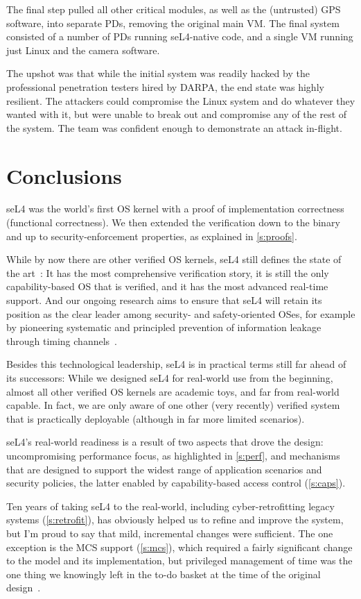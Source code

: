 \documentclass[english,a4paper,12pt]{report}
\newcommand{\Sect}[1]{\section{#1}}
\newcommand{\Sect}[1]{\chapter{#1}}
\begin{document}
  The final step pulled all other critical modules, as well as the
  (untrusted) GPS software, into separate PDs, removing
  the original main VM. The final system consisted of a number of
  PDs running seL4-native code, and a single VM running
  just Linux and the camera software.

  The upshot was that while the initial system was readily hacked by
  the professional penetration testers hired by DARPA, the end state was highly
  resilient. The attackers could compromise the Linux system and do
  whatever they wanted with it, but were unable to break out and
  compromise any of the rest of the system. The team was confident
  enough to demonstrate an attack in-flight.

  \Sect{\label{s:concl}Conclusions}

  seL4 was the world's first OS kernel with a proof of implementation
  correctness (functional correctness). We then extended the
  verification down to the
  binary and up to security-enforcement properties, as explained in
  \autoref{s:proofs}.

  While by now there are other verified OS kernels, seL4 still defines
  the state of the art~\citep{Heiser:10y-blog}: It has the most
  comprehensive verification story, it is still the only
  capability-based OS that is verified, and it has the most advanced
  real-time support. And our ongoing research aims to ensure that
  seL4 will retain its position as the clear leader among security-
  and safety-oriented OSes, for example by pioneering systematic and
  principled prevention of information leakage through timing
  channels~\citep{Ge_YCH_19}.

  Besides this technological leadership, seL4 is in practical terms
  still far ahead of its successors: While we designed seL4 for
  real-world use from the beginning, almost all other verified OS
  kernels are academic toys, and far from real-world capable. In fact, we
  are only aware of one other (very recently) verified system that is
  practically deployable (although in far more limited scenarios).

  seL4's real-world readiness is a result of two aspects that drove
  the design: uncompromising performance focus, as highlighted in
  \autoref{s:perf}, and mechanisms that are designed to support the
  widest range of application scenarios and security policies, the
  latter enabled by capability-based access control
  (\autoref{s:caps}).

  Ten years of taking seL4 to the real-world, including
  cyber-retrofitting legacy systems (\autoref{s:retrofit}), has obviously
  helped us to refine and improve the system, but I'm proud to say that
  mild, incremental changes were sufficient. The one exception is the
  MCS support (\autoref{s:mcs}), which required a fairly significant change
  to the model and its implementation, but privileged management of
  time was the one thing we knowingly left in the to-do basket at
  the time of the original design~\citep{Heiser_Elphinstone_16}.
\end{document}
